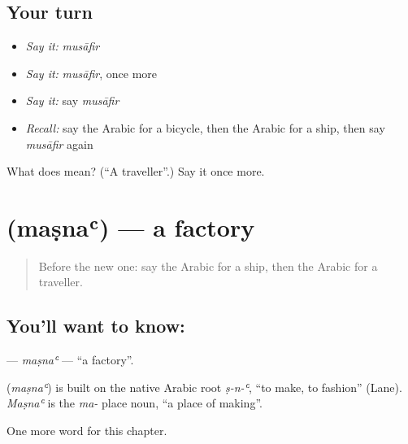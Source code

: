 \subsection*{Your turn}
\begin{itemize}
\raggedright
  \item \emph{Say it:} \emph{musāfir}
  \item \emph{Say it:} \emph{musāfir}, once more
  \item \emph{Say it:} say \emph{musāfir}
  \item \emph{Recall:} say the Arabic for a bicycle, then the Arabic for a ship, then say \emph{musāfir} again
\end{itemize}

\begin{tcolorbox}[breakable,colback=teal!4,colframe=teal!35!black,title={Before you move on}]
What does  mean? (\textquotedblleft{}A traveller\textquotedblright{}.) Say it once more.
\end{tcolorbox}
\section[\texorpdfstring{\ar{مصنع} (maṣnaʿ)}{مصنع (maṣnaʿ)}]{ (maṣnaʿ) — a factory}

\label{lesson:AR-C142-masna}



\begin{quote}
Before the new one: say the Arabic for a ship, then the Arabic for a traveller.
\end{quote}

\subsection*{You'll want to know: }
\textbf{} — \emph{maṣnaʿ} — \textquotedblleft{}a factory\textquotedblright{}.

\begin{cousinweb}
\textbf{} (\emph{maṣnaʿ}) is built on the native Arabic root \emph{ṣ-n-ʿ}, \textquotedblleft{}to make, to fashion\textquotedblright{} (Lane). \emph{Maṣnaʿ} is the \emph{ma-} place noun, \textquotedblleft{}a place of making\textquotedblright{}.
\end{cousinweb}

\begin{grammarlens}[title={What you've built}]
One more word for this chapter.
\end{grammarlens}

